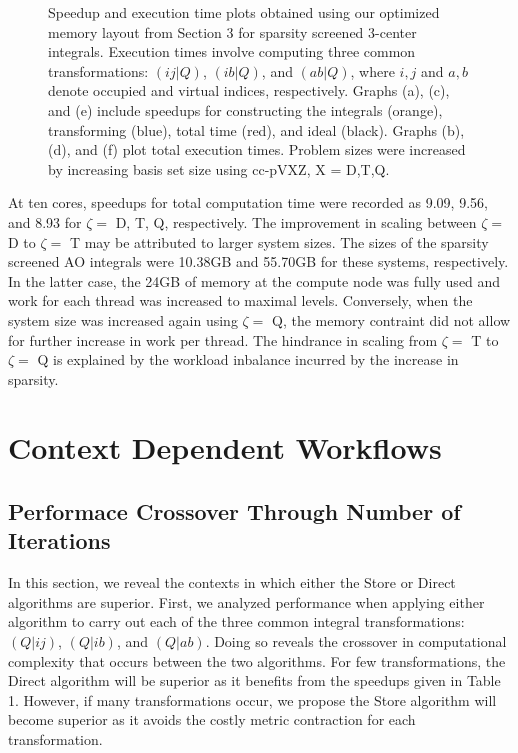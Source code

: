 \begin{figure}[H]
  \hfill
  \hfill
  \caption{Speedup and execution time plots obtained using our optimized memory layout from Section 3 for sparsity screened 3-center integrals. 
 Execution times involve computing three common transformations: $(ij|Q)$, $(ib|Q)$, and $(ab|Q)$,
 where $i,j$ and $a,b$ denote occupied and virtual indices, respectively. Graphs (a), (c), and (e) include speedups for constructing the integrals (orange),
 transforming (blue), total time (red), and ideal (black). Graphs (b), (d), and (f) plot total execution times. Problem sizes were increased by increasing basis set size
 using cc-pVXZ, X = D,T,Q.}
\end{figure}

At ten cores, speedups for total computation time were recorded as 9.09, 9.56, and 8.93 for $\zeta = $ D, T, Q, 
respectively. The improvement in scaling between $\zeta = $ D to $\zeta = $ T
may be attributed to larger system sizes. The sizes of the sparsity screened AO integrals were 10.38GB and 55.70GB 
for these systems, respectively. In the latter case,
the 24GB of memory at the compute node was fully used and work for each thread was increased to maximal levels. Conversely, 
when the system size was increased again using
$\zeta = $ Q, the memory contraint did not allow for further increase in work per thread. 
The hindrance in scaling from $\zeta = $ T to $\zeta = $ Q is explained by the workload inbalance incurred by
the increase in sparsity. 


\section{Context Dependent Workflows}

\subsection{Performace Crossover Through Number of Iterations}
 In this section, we reveal the contexts in which either the Store or Direct algorithms are superior. First, we analyzed performance when applying either algorithm
 to carry out each of the three common integral transformations: $(Q|ij)$, $(Q|ib)$, and $(Q|ab)$. Doing so reveals the crossover in computational complexity that occurs between the two
 algorithms. For few transformations, the Direct algorithm will be superior as it benefits from the speedups given
 in Table 1. However, if many transformations occur, we propose the Store algorithm will become superior as it avoids the costly metric contraction for each transformation.
 
